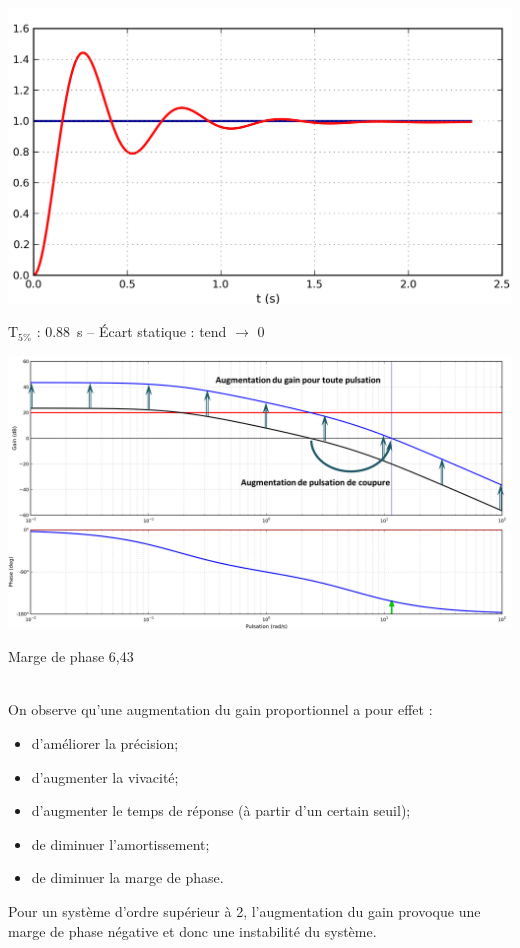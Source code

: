 \documentclass[10pt,fleqn]{article} %
\begin{document}
\noindent
\begin{minipage}[c]{.46\linewidth}
\begin{center}
\includegraphics[width=\linewidth]{images/fig_05a}

$\text{T}_{5\%}$ : \SI{0,88}{s} -- Écart statique : tend $\to$ 0
\end{center}

\end{minipage} \hfill
\begin{minipage}[c]{.46\linewidth}
\begin{center}
\includegraphics[width=\linewidth]{images/fig_05b}

Marge de phase 6,43 \degres
\end{center}
\end{minipage} 

\begin{resultat}
~\\
On observe qu'une augmentation du gain proportionnel a pour effet :
\begin{itemize}
\item d'améliorer la précision;
\item d'augmenter la vivacité;
\item d'augmenter le temps de réponse (à partir d'un certain seuil);
\item de diminuer l'amortissement;
\item de diminuer la marge de phase.
\end{itemize}
Pour un système d'ordre supérieur à 2, l'augmentation du gain provoque une marge de phase négative et donc une instabilité du système.
\end{resultat}
\end{document}
